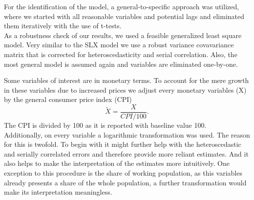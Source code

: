 \documentclass[
]{article}
\begin{document}
For the identification of the model, a general-to-specific approach was utilized, where we started with all reasonable variables and potential lags and eliminated them iteratively with the use of t-tests.\\
As a robustness check of our results, we used a feasible generalized least square model. Very similar to the SLX model we use a robust variance covavariance matrix that is corrected for heteroscedasticity and serial correlation. Also, the most general model is assumed again and variables are eliminated one-by-one.\par
Some variables of interest are in monetary terms. To account for the mere growth in these variables due to increased prices we adjust every monetary variables (X) by the general consumer price index (CPI)
$$\widetilde{X} = \frac{X}{CPI/100}.$$
The CPI is divided by 100 as it is reported with baseline value 100.\\
Additionally, on every variable a logarithmic transformation was used. The reason for this is twofold. To begin with it might further help with the heteroscedastic and serially correlated errors and therefore provide more reliant estimates. And it also helps to make the interpretation of the estimates more intuitively. One exception to this procedure is the share of working population, as this variables already presents a share of the whole population, a further transformation would make its interpretation meaningless.\\
\end{document}
